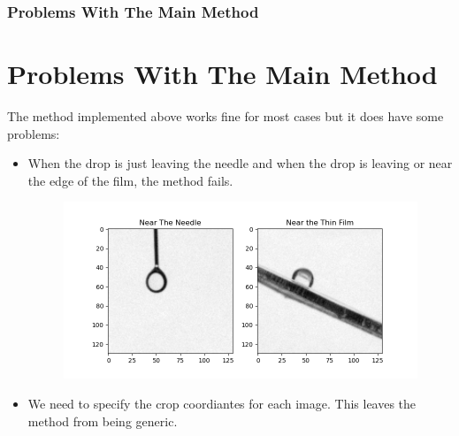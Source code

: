 \documentclass{beamer}
\begin{document}
\begin{frame}
    \frametitle{Problems With The Main Method}
    \section{Problems With The Main Method}
    The method implemented above works fine for most cases but it does have some problems:
    \begin{itemize}
        \item <1-> When the drop is just leaving the needle and when the drop is leaving or near the edge of the film, the method fails.
              \begin{figure}
                  \centering
                  \includegraphics[scale=0.4]{problems1.png}
              \end{figure}
        \item <2-> We need to specify the crop coordiantes for each image. This leaves the method from being generic.
    \end{itemize}
\end{frame}
\end{document}
